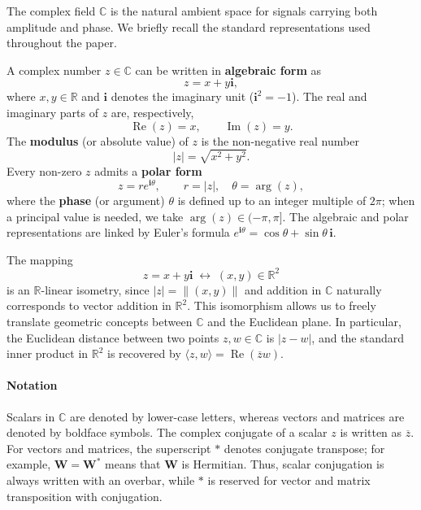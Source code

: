 \documentclass[10pt,journal,letterpaper]{IEEEtran}
\begin{document}
The complex field $\mathbb{C}$ is the natural ambient space for signals carrying 
both amplitude and phase. We briefly recall the standard representations used 
throughout the paper.

A complex number $z \in \mathbb{C}$ can be written in \textbf{algebraic form} as
\begin{equation}
    z = x + y\mathbf{i},
\end{equation}
where $x, y \in \mathbb{R}$ and $\mathbf{i}$ denotes the imaginary unit 
($\mathbf{i}^2 = -1$). The real and imaginary parts of $z$ are, respectively,
\begin{equation}
    \operatorname{Re}(z) = x, \qquad \operatorname{Im}(z) = y.
\end{equation}
The \textbf{modulus} (or absolute value) of $z$ is the non-negative real number
\begin{equation}
    |z| = \sqrt{x^2 + y^2}.
\end{equation}
Every non-zero $z$ admits a \textbf{polar form}
\begin{equation}
    z = r e^{\mathbf{i}\theta}, \qquad r = |z|, \quad \theta = \arg(z),
\end{equation}
where the \textbf{phase} (or argument) $\theta$ is defined up to an integer multiple 
of $2\pi$; when a principal value is needed, we take $\arg(z) \in (-\pi,\pi]$. 
The algebraic and polar representations are linked by Euler's formula
$e^{\mathbf{i}\theta} = \cos\theta + \sin\theta\,\mathbf{i}$.

The mapping
\begin{equation}
    z = x + y\mathbf{i} \;\longleftrightarrow\; (x,y) \in \mathbb{R}^2
\end{equation}
is an $\mathbb{R}$-linear isometry, since $|z| = \|(x,y)\|$ and addition in 
$\mathbb{C}$ naturally corresponds to vector addition in $\mathbb{R}^2$. This isomorphism 
allows us to freely translate geometric concepts between $\mathbb{C}$ and the 
Euclidean plane. In particular, the Euclidean distance between two points 
$z,w\in\mathbb{C}$ is $|z-w|$, and the standard inner product in $\mathbb{R}^2$ 
is recovered by $\langle z, w \rangle = \operatorname{Re}(\overline{z} w)$.

\paragraph*{Notation}
Scalars in $\mathbb{C}$ are denoted by lower-case letters, whereas vectors and
matrices are denoted by boldface symbols. The complex conjugate of a scalar
$z$ is written as $\overline{z}$. For vectors and matrices, the superscript
$*$ denotes conjugate transpose; for example, $\boldsymbol{W}=\boldsymbol{W}^*$
means that $\boldsymbol{W}$ is Hermitian. Thus, scalar conjugation is always
written with an overbar, while $*$ is reserved for vector and matrix
transposition with conjugation.
\end{document}
